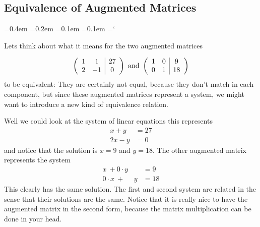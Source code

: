 \subsection*{Equivalence of Augmented Matrices}

{\ttfamily
{}\font=0.4em
\font=0.2em
\font=0.1em
\font=0.1em
\hyphenchar\font=`\-


\hypertarget{script_gaussian_elimination_background}{Lets think about what it means for the two augmented matrices} 
\[ \left( \begin{array}{cc | c}
1 & 1 & 27 \\
2 & -1 & 0  
\end{array} \right)
\mbox{ and } \left( \begin{array}{cc | c}
1 & 0 & 9 \\
0 & 1 & 18  
\end{array} \right)
\]
to be equivalent:
They are certainly not equal, because they don't match in each component, but since these augmented matrices represent a system, we might want to introduce a new kind of equivalence relation.

Well we could look at the system of linear equations this represents 
\begin{align*}
 x+y &= 27\\
 2x - y &= 0
\end{align*}
and notice that the solution is $x=9$ and $y=18$. The other augmented matrix represents the system 
\begin{align*}
 x\ +0 \cdot y &= 9\\
 0 \cdot x \ +\   \phantom{0 \cdot} y  &= 18
\end{align*}
This clearly has the same solution. The first and second system are related in the sense that their solutions are the same. Notice that it is really nice to have the augmented matrix in the second form, because the matrix multiplication can be done in your head.


}

